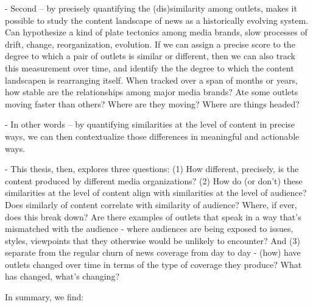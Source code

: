 \documentclass{scrartcl}
\begin{document}
- Second -- by precisely quantifying the (dis)similarity among outlets, makes it possible to study the content landscape of news as a historically evolving system. Can hypothesize a kind of plate tectonics among media brands, slow processes of drift, change, reorganization, evolution. If we can assign a precise score to the degree to which a pair of outlets is similar or different, then we can also track this measurement over time, and identify the the degree to which the content landscapen is rearranging itself. When tracked over a span of months or years, how stable are the relationships among major media brands? Ate some outlets moving faster than others? Where are they moving? Where are things headed?

- In other words -- by quantifying similarities at the level of content in precise ways, we can then contextualize those differences in meaningful and actionable ways.

- This thesis, then, explores three questions: (1) How different, precisely, is the content produced by different media organizations? (2) How do (or don't) these similarities at the level of content align with similarities at the level of audience? Does similarly of content correlate with similarity of audience? Where, if ever, does this break down? Are there examples of outlets that speak in a way that's mismatched with the audience - where audiences are being exposed to issues, styles, viewpoints that they otherwise would be unlikely to encounter? And (3) separate from the regular churn of news coverage from day to day - (how) have outlets changed over time in terms of the type of coverage they produce? What has changed, what's changing?

In summary, we find:
\end{document}
